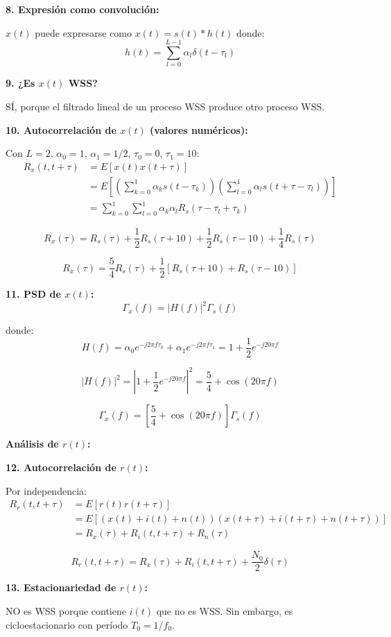 \documentclass[10pt,a4paper]{article}
\begin{document}
\begin{solucion}
\textbf{8. Expresión como convolución:}

$x(t)$ puede expresarse como $x(t) = s(t) * h(t)$ donde:
\[
\boxed{h(t) = \sum_{l=0}^{L-1} \alpha_l \delta(t - \tau_l)}
\]

\textbf{9. ¿Es $x(t)$ WSS?}

SÍ, porque el filtrado lineal de un proceso WSS produce otro proceso WSS.

\textbf{10. Autocorrelación de $x(t)$ (valores numéricos):}

Con $L = 2$, $\alpha_0 = 1$, $\alpha_1 = 1/2$, $\tau_0 = 0$, $\tau_1 = 10$:
\begin{align*}
R_x(t, t+\tau) &= E[x(t)x(t+\tau)]\\
&= E\left[\left(\sum_{k=0}^{1} \alpha_k s(t-\tau_k)\right)\left(\sum_{l=0}^{1} \alpha_l s(t+\tau-\tau_l)\right)\right]\\
&= \sum_{k=0}^{1}\sum_{l=0}^{1} \alpha_k \alpha_l R_s(\tau - \tau_l + \tau_k)
\end{align*}

\[
\boxed{R_x(\tau) = R_s(\tau) + \frac{1}{2}R_s(\tau + 10) + \frac{1}{2}R_s(\tau - 10) + \frac{1}{4}R_s(\tau)}
\]

\[
\boxed{R_x(\tau) = \frac{5}{4}R_s(\tau) + \frac{1}{2}[R_s(\tau + 10) + R_s(\tau - 10)]}
\]

\textbf{11. PSD de $x(t)$:}
\[
\Gamma_x(f) = |H(f)|^2 \Gamma_s(f)
\]

donde:
\[
H(f) = \alpha_0 e^{-j2\pi f\tau_0} + \alpha_1 e^{-j2\pi f\tau_1} = 1 + \frac{1}{2}e^{-j20\pi f}
\]

\[
|H(f)|^2 = \left|1 + \frac{1}{2}e^{-j20\pi f}\right|^2 = \frac{5}{4} + \cos(20\pi f)
\]

\[
\boxed{\Gamma_x(f) = \left[\frac{5}{4} + \cos(20\pi f)\right] \Gamma_s(f)}
\]

\vspace{5mm}
\textbf{Análisis de $r(t)$:}

\textbf{12. Autocorrelación de $r(t)$:}

Por independencia:
\begin{align*}
R_r(t, t+\tau) &= E[r(t)r(t+\tau)]\\
&= E[(x(t) + i(t) + n(t))(x(t+\tau) + i(t+\tau) + n(t+\tau))]\\
&= R_x(\tau) + R_i(t, t+\tau) + R_n(\tau)
\end{align*}

\[
\boxed{R_r(t, t+\tau) = R_x(\tau) + R_i(t, t+\tau) + \frac{N_0}{2}\delta(\tau)}
\]

\textbf{13. Estacionariedad de $r(t)$:}

NO es WSS porque contiene $i(t)$ que no es WSS. Sin embargo, es cicloestacionario con período $T_0 = 1/f_0$.
\end{solucion}
\end{document}
